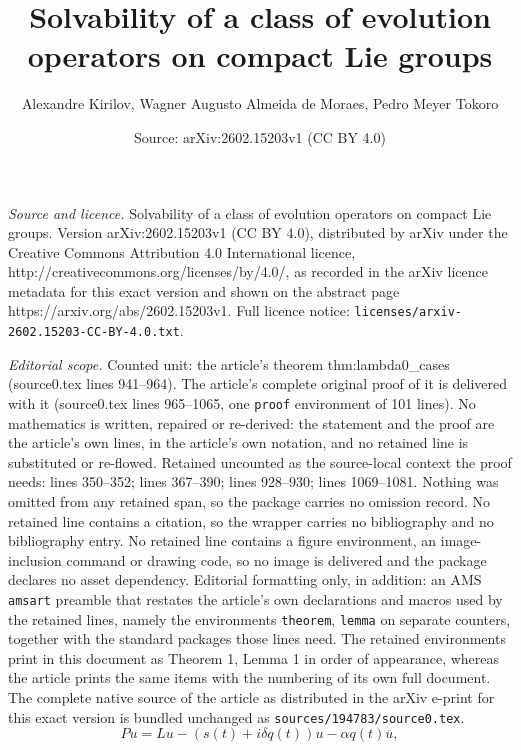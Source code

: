 \documentclass[10pt,a4paper]{amsart}
\title{Solvability of a class of evolution operators on compact Lie groups}
\author{Alexandre Kirilov, Wagner Augusto Almeida de Moraes, Pedro Meyer Tokoro}
\date{Source: arXiv:2602.15203v1 (CC BY 4.0)}
\begin{document}
\maketitle

\noindent\emph{Source and licence.} Solvability of a class of evolution operators on compact Lie groups. Version arXiv:2602.15203v1 (CC BY 4.0), distributed by arXiv under the Creative Commons Attribution 4.0 International licence, http://creativecommons.org/licenses/by/4.0/, as recorded in the arXiv licence metadata for this exact version and shown on the abstract page https://arxiv.org/abs/2602.15203v1. Full licence notice: \texttt{licenses/arxiv-2602.15203-CC-BY-4.0.txt}.\par\smallskip

\noindent\textit{Editorial scope.} Counted unit: the article's theorem thm:lambda0\_cases (source0.tex lines 941--964). The article's complete original proof of it is delivered with it (source0.tex lines 965--1065, one \texttt{proof} environment of 101 lines). No mathematics is written, repaired or re-derived: the statement and the proof are the article's own lines, in the article's own notation, and no retained line is substituted or re-flowed.  Retained uncounted as the source-local context the proof needs: lines 350--352; lines 367--390; lines 928--930; lines 1069--1081.  Nothing was omitted from any retained span, so the package carries no omission record.  No retained line contains a citation, so the wrapper carries no bibliography and no bibliography entry.  No retained line contains a figure environment, an image-inclusion command or drawing code, so no image is delivered and the package declares no asset dependency.  Editorial formatting only, in addition: an AMS \texttt{amsart} preamble that restates the article's own declarations and macros used by the retained lines, namely the environments \texttt{theorem}, \texttt{lemma} on separate counters, together with the standard packages those lines need.  The retained environments print in this document as Theorem 1, Lemma 1 in order of appearance, whereas the article prints the same items with the numbering of its own full document.  The complete native source of the article as distributed in the arXiv e-print for this exact version is bundled unchanged as \texttt{sources/194783/source0.tex}.
	\begin{equation}\label{eq:P_cv}
		Pu=Lu-(s(t)+i\delta q(t))u-\alpha q(t)\overline{u},
	\end{equation}
\end{document}
